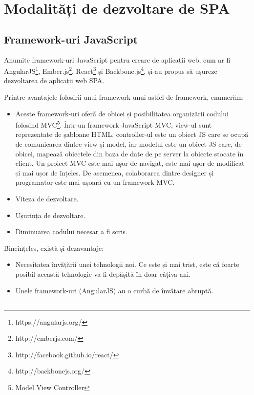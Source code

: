 \section{Modalități de dezvoltare de SPA}

\subsection{Framework-uri JavaScript}

Anumite framework-uri JavaScript pentru creare de aplicații web, cum ar fi
AngularJS\footnote{https://angularjs.org/},
Ember.js\footnote{http://emberjs.com/},
React\footnote{http://facebook.github.io/react/} și
Backbone.js\footnote{http://backbonejs.org/},
și-au propus să ușureze dezvoltarea
de aplicații web SPA.

Printre avantajele folosirii unui framework unui astfel
de framework, enumerăm:
\begin{itemize}
  \item Aceste framework-uri oferă de obicei și posibilitatea organizării codului
  folosind MVC\footnote{Model View Controller}. Într-un framework JavaScript MVC,
  view-ul sunt reprezentate de șabloane HTML, controller-ul este un obiect JS
  care se ocupă de comunicarea dintre view și model, iar modelul este un obiect JS
  care, de obicei, mapează obiectele din baza de date de pe server la obiecte
  stocate în client. Un proiect MVC este mai ușor de navigat, este mai ușor
  de modificat și mai ușor de înțeles. De asemenea, colaborarea dintre
  designer și programator este mai ușoară cu un framework MVC.
  \item Viteza de dezvoltare.
  \item Ușurința de dezvoltare.
  \item Diminuarea codului necesar a fi scris.
\end{itemize}

Bineînțeles, există și dezavantaje:
\begin{itemize}
  \item Necesitatea învățării unei tehnologii noi. Ce este și mai trist, este
  că foarte posibil această tehnologie va fi depășită în doar câțiva ani.
  \item Unele framework-uri (AngularJS) au o curbă de învățare abruptă.
\end{itemize}

\subsection{}

